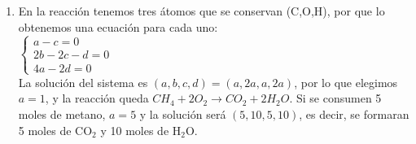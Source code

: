 \documentclass[a4paper]{article}
\begin{document}
\begin{enumerate}
\begin{enumerate} [label=(\alph*)]
		\item En la reacción tenemos tres átomos que se conservan (C,O,H), por que lo obtenemos una ecuación para cada uno: \\ \vspace{2mm} $\left\{\begin{matrix} a-c = 0 \\ 2b -2c -d = 0 \\ 4a - 2d = 0 \end{matrix}\right.$ \\ La solución del sistema es $(a,b,c,d) = (a,2a,a,2a)$, por lo que elegimos $a=1$, y la reacción queda $ CH_4 + 2O_2 \to CO_2 + 2 H_{2}O$. Si se consumen 5 moles de metano, $a=5$ y la solución será $(5,10,5,10)$, es decir, se formaran 5 moles de CO$_2$ y 10 moles de H$_2$O.
\end{enumerate}\end{enumerate}
\end{document}
